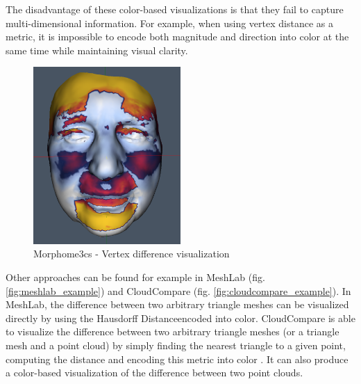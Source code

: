 The disadvantage of these color-based visualizations is that they fail to capture multi-dimensional information. For example, when using vertex distance as a metric, it is impossible to encode both magnitude and direction into color at the same time while maintaining visual clarity.

\begin{figure}[h]
\centering
\includegraphics[width=0.5\textwidth]{./img/morpho-example01.PNG}
\caption{Morphome3cs - Vertex difference visualization}
\label{fig:morpho_example}
\end{figure}

Other approaches can be found for example in MeshLab (fig. \ref{fig:meshlab_example}) and CloudCompare (fig. \ref{fig:cloudcompare_example}). In MeshLab, the difference between two arbitrary triangle meshes can be visualized directly by using the Hausdorff Distance\footnotemark encoded into color. CloudCompare is able to visualize the difference between two arbitrary triangle meshes (or a triangle mesh and a point cloud) by simply finding the nearest triangle to a given point, computing the distance and encoding this metric into color \citep{CloudCmpDistance}. It can also produce a color-based visualization of the difference between two point clouds.

